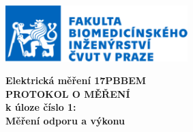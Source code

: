\documentclass{article}
\begin{document}
	\newcommand{\SC}{Protokol-17PBBEM-2425-UČ1-MatousSizling-24-16-11} %
	\newcommand{\uloha}{Měření odporu a výkonu} %
	\newcommand{\autor}{Matouš Šizling}
	\newcommand{\prilohy}{
		\newpage
		\renewcommand\thesection{\Alph{section}}
		\setcounter{section}{0}
		\section*{Přílohy:}
	} %
\newcommand{\stddev}[2]{
	U_{A,#1} = \sqrt{\frac{1}{N \cdot (N-1)} \cdot \sum_{n=1}^{N} \left( R_N - \overline{#2}_{#1} \right)^2}
}

	\begin{titlepage}
	\begin{figure}[t]
		\begin{center}
			\includegraphics[width=200pt]{screenshot001}
		\end{center}
	\end{figure}
	\begin{figure}
		\LARGE
		\centering
		\textbf{
			Elektrická měření 17PBBEM \\
			PROTOKOL O MĚŘENÍ \\
			k úloze číslo 1:\\
			\uloha}
	\end{figure}
	\end{titlepage}
	
\end{document}
